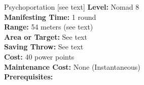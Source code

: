 {Psychoportation [see text]}
{
	\textbf{Level:}
	Nomad 8\\
	\textbf{Manifesting Time:}
	1 round\\
	\textbf{Range:}
	54 meters (see text)\\
	\textbf{Area or Target:}
	See text\\
	\textbf{Saving Throw:}
	See text\\
	\textbf{Cost:}
	40 power points\\
	\textbf{Maintenance Cost:}
	None (Instantaneous)\\
	\textbf{Prerequisites:}
	\\
}
